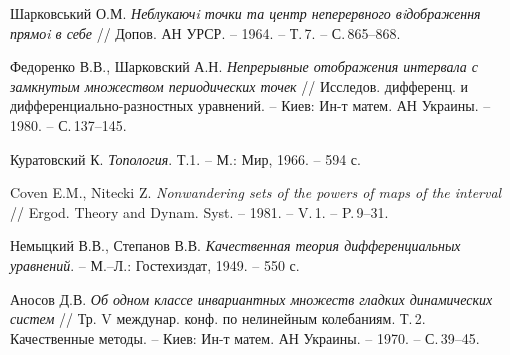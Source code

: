 \begin{thebibliography}{99}
Шарковський О.М. {\em Неблукаючi точки та центр неперервного
вiдображення прямоi в себе} // Допов. АН УРСР. -- 1964. -- Т.\,7.
-- С.\,865--868.

Федоренко В.В., Шарковский А.Н. {\em Непрерывные отображения интервала
с замкнутым множеством периодических точек} //
Исследов. дифференц. и дифференциально-разностных
уравнений. -- Киев: Ин-т матем. АН Украины. -- 1980. -- С.\,137--145.

Куратовский К. {\em Топология}. Т.1. -- М.: Мир, 1966. -- 594 с.

Coven E.M., Nitecki Z. {\em Nonwandering sets of the powers of maps
of the interval} // Ergod. Theory and Dynam. Syst. -- 1981.
-- V.\,1. -- P.\,9--31.

Немыцкий В.В., Степанов В.В. {\em Качественная теория дифференциальных
уравнений}. -- М.--Л.: Гостехиздат, 1949. -- 550 с.

Аносов Д.В. {\em Об одном классе инвариантных множеств гладких
динамических систем} // Тр. V междунар. конф. по нелинейным колебаниям.
Т.\,2. Качественные методы. -- Киев: Ин-т матем. АН Украины. -- 1970.
-- С.\,39--45.


\end{thebibliography}

\vskip 2cm


\label{end}



